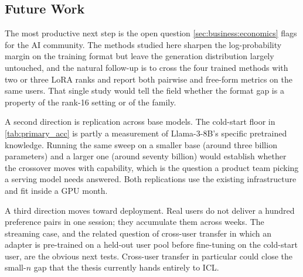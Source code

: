 \subsection{Future Work}
\label{sec:limits:future}

The most productive next step is the open question \cref{sec:business:economics} flags for the AI community. The methods studied here sharpen the log-probability margin on the training format but leave the generation distribution largely untouched, and the natural follow-up is to cross the four trained methods with two or three LoRA ranks and report both pairwise and free-form metrics on the same users. That single study would tell the field whether the format gap is a property of the rank-16 setting or of the family.

A second direction is replication across base models. The cold-start floor in \cref{tab:primary_acc} is partly a measurement of Llama-3-8B's specific pretrained knowledge. Running the same sweep on a smaller base (around three billion parameters) and a larger one (around seventy billion) would establish whether the crossover moves with capability, which is the question a product team picking a serving model needs answered. Both replications use the existing infrastructure and fit inside a GPU month.

A third direction moves toward deployment. Real users do not deliver a hundred preference pairs in one session; they accumulate them across weeks. The streaming case, and the related question of cross-user transfer in which an adapter is pre-trained on a held-out user pool before fine-tuning on the cold-start user, are the obvious next tests. Cross-user transfer in particular could close the small-$n$ gap that the thesis currently hands entirely to ICL.